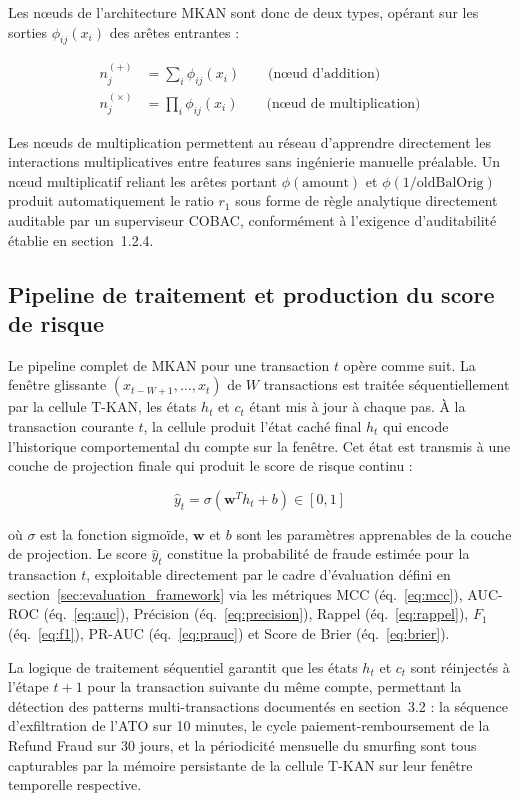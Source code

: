 \documentclass[11pt,a4paper,oneside]{report}
\theoremstyle{definition}
\theoremstyle{remark}
\begin{document}
Les nœuds de l'architecture MKAN sont donc de deux types, opérant sur les sorties $\phi_{ij}(x_i)$ des arêtes entrantes :

\begin{align}
    n_j^{(+)}   &= \sum_{i} \phi_{ij}(x_i) \qquad \text{(nœud d'addition)} \\[4pt]
    n_j^{(\times)} &= \prod_{i} \phi_{ij}(x_i) \qquad \text{(nœud de multiplication)}
\end{align}

Les nœuds de multiplication permettent au réseau d'apprendre directement les interactions multiplicatives entre features sans ingénierie manuelle préalable. Un nœud multiplicatif reliant les arêtes portant $\phi(\text{amount})$ et $\phi(1/\text{oldBalOrig})$ produit automatiquement le ratio $r_1$ sous forme de règle analytique directement auditable par un superviseur COBAC, conformément à l'exigence d'auditabilité établie en section~1.2.4.

\subsection{Pipeline de traitement et production du score de risque}

Le pipeline complet de MKAN pour une transaction $t$ opère comme suit. La fenêtre glissante $(x_{t-W+1}, \ldots, x_t)$ de $W$ transactions est traitée séquentiellement par la cellule T-KAN, les états $h_t$ et $c_t$ étant mis à jour à chaque pas. À la transaction courante $t$, la cellule produit l'état caché final $h_t$ qui encode l'historique comportemental du compte sur la fenêtre. Cet état est transmis à une couche de projection finale qui produit le score de risque continu :

\begin{equation}
    \hat{y}_t = \sigma\!\left(\mathbf{w}^T h_t + b\right) \in [0,1]
\end{equation}

où $\sigma$ est la fonction sigmoïde, $\mathbf{w}$ et $b$ sont les paramètres apprenables de la couche de projection. Le score $\hat{y}_t$ constitue la probabilité de fraude estimée pour la transaction $t$, exploitable directement par le cadre d'évaluation défini en section~\ref{sec:evaluation_framework} via les métriques MCC (éq.~\ref{eq:mcc}), AUC-ROC (éq.~\ref{eq:auc}), Précision (éq.~\ref{eq:precision}), Rappel (éq.~\ref{eq:rappel}), $F_1$ (éq.~\ref{eq:f1}), PR-AUC (éq.~\ref{eq:prauc}) et Score de Brier (éq.~\ref{eq:brier}).

La logique de traitement séquentiel garantit que les états $h_t$ et $c_t$ sont réinjectés à l'étape $t+1$ pour la transaction suivante du même compte, permettant la détection des patterns multi-transactions documentés en section~3.2 : la séquence d'exfiltration de l'ATO sur 10 minutes, le cycle paiement-remboursement de la Refund Fraud sur 30 jours, et la périodicité mensuelle du smurfing sont tous capturables par la mémoire persistante de la cellule T-KAN sur leur fenêtre temporelle respective.
\end{document}
